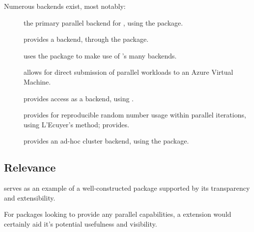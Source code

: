 Numerous backends exist, most notably:

\begin{description}
	\item[]
		the primary parallel backend for , using the  package\cite{corporation19}.
	\item[]
		provides a  backend, through the  package\cite{lewis20}.
	\item[]
		uses the  package to make use of 's many backends\cite{bengtsson20do}.
	\item[]
		allows for direct submission of parallel workloads to an Azure Virtual Machine\cite{hoang20}.
	\item[]
		provides  access as a backend, using \cite{weston17}.
	\item[]
		provides for reproducible random number usage within parallel
		iterations, using L'Ecuyer's method; provides\cite{gaujoux20}.
	\item[]
		provides an ad-hoc cluster backend, using the  package\cite{dosnow19}.
\end{description}

\subsection{Relevance}\label{relevance}

 serves as an example of a well-constructed package supported by
its transparency and extensibility.

For packages looking to provide any parallel capabilities, a  extension would certainly aid it's potential usefulness and visibility.

